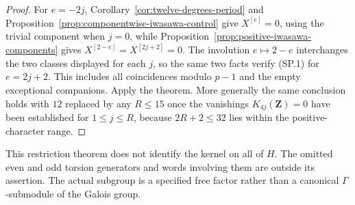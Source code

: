 \begin{proof}
For $e=-2j$, Corollary~\ref{cor:twelve-degrees-period} and
Proposition~\ref{prop:componentwise-iwasawa-control} give
$X^{[e]}=0$, using the trivial component when $j=0$, while
Proposition~\ref{prop:positive-iwasawa-components} gives
$X^{[2-e]}=X^{[2j+2]}=0$. The involution $e\mapsto2-e$
interchanges the two classes displayed for each $j$, so the
same two facts verify (SP.1) for $e=2j+2$. This includes all
coincidences modulo $p-1$ and the empty exceptional companions.
Apply the theorem. More generally the same conclusion holds
with $12$ replaced by any $R\leq15$ once the vanishings
$K_{4j}(\mathbf Z)=0$ have been established for $1\leq j\leq R$,
because $2R+2\leq32$ lies within the positive-character range.
\end{proof}

This restriction theorem does not identify the kernel on all of
$H$. The omitted even and odd torsion generators and words
involving them are outside its assertion. The actual subgroup
is a specified free factor rather than a canonical
$\Gamma$-submodule of the Galois group.
